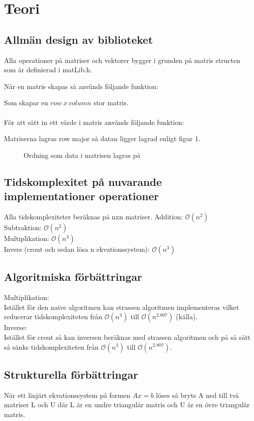 \section{Teori}

\subsection{Allmän design av biblioteket}
Alla operationer på matriser och vektorer bygger i grunden på matris structen som är definierad i matLib.h.

När en matris skapas så används följande funktion:

Som skapar en $row \ x \ column$ stor matris. \\ \\
För att sätt in ett värde i matris används följande funktion:

Matriserna lagras row major så datan ligger lagrad enligt figur 1. 
\begin{figure}[h]
\center
\scalebox{0.8}{}
\caption{Ordning som data i matrisen lagras på}
\end{figure}


\subsection{Tidskomplexitet på nuvarande implementationer operationer}
Alla tidskomplexiteter beräknas på nxn matriser.
Addition: $\mathcal{O}(n^2)$\\
Subtraktion: $\mathcal{O}(n^2)$\\
Multiplikation: $\mathcal{O}(n^3)$\\
Invers (crout och sedan lösa n ekvationssystem): $\mathcal{O}(n^3)$\\ 

\subsection{Algoritmiska förbättringar}
Multiplikation:\\
Istället för den naive algoritmen kan strassen algoritmen implementeras vilket reducerar tidskomplexiteten från $\mathcal{O}(n^3)$ till $\mathcal{O}(n^{2.807})$ (källa). \\
Inverse:\\
Istället för crout så kan inversen beräknas med strassen algoritmen och på så sätt så sänks tidskomplexiteten från $\mathcal{O}(n^3)$ till $\mathcal{O}(n^{2.807})$.

\subsection{Strukturella förbättringar}
När ett linjärt ekvationssystem på formen $Ax=b $ löses så bryts A ned till två matriser L och U där L är en undre triangulär matris och U är en övre triangulär matris. 